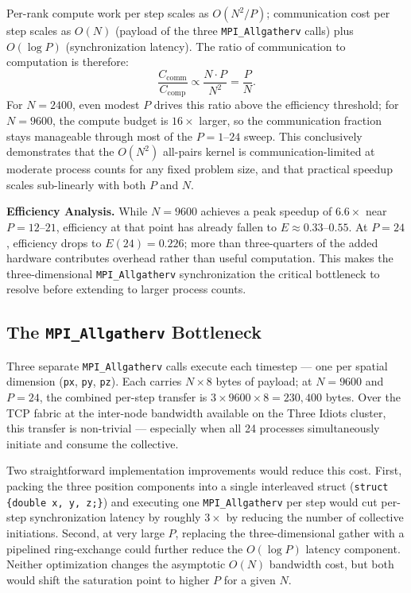 \documentclass[11pt]{article}
\begin{document}
Per-rank compute work per step scales as $O(N^2/P)$; communication cost per step scales as $O(N)$ (payload of the three \texttt{MPI\_Allgatherv} calls) plus $O(\log P)$ (synchronization latency). The ratio of communication to computation is therefore:
\begin{equation}
  \frac{C_\text{comm}}{C_\text{comp}} \propto \frac{N \cdot P}{N^2} = \frac{P}{N}.
\end{equation}
For $N = 2400$, even modest $P$ drives this ratio above the efficiency threshold; for $N = 9600$, the compute budget is $16\times$ larger, so the communication fraction stays manageable through most of the $P = 1$--$24$ sweep. This conclusively demonstrates that the $O(N^2)$ all-pairs kernel is communication-limited at moderate process counts for any fixed problem size, and that practical speedup scales sub-linearly with both $P$ and $N$.

\textbf{Efficiency Analysis.}  While $N = 9600$ achieves a peak speedup of $6.6\times$ near $P = 12$--$21$, efficiency at that point has already fallen to $E \approx 0.33$--$0.55$. At $P = 24$, efficiency drops to $E(24) = 0.226$; more than three-quarters of the added hardware contributes overhead rather than useful computation. This makes the three-dimensional \texttt{MPI\_Allgatherv} synchronization the critical bottleneck to resolve before extending to larger process counts.

\subsection{The \texttt{MPI\_Allgatherv} Bottleneck}

Three separate \texttt{MPI\_Allgatherv} calls execute each timestep — one per spatial dimension (\texttt{px}, \texttt{py}, \texttt{pz}). Each carries $N \times 8$ bytes of payload; at $N = 9600$ and $P = 24$, the combined per-step transfer is $3 \times 9600 \times 8 = 230{,}400$ bytes. Over the TCP fabric at the inter-node bandwidth available on the Three Idiots cluster, this transfer is non-trivial — especially when all 24 processes simultaneously initiate and consume the collective.

Two straightforward implementation improvements would reduce this cost. First, packing the three position components into a single interleaved struct (\texttt{struct \{double x, y, z;\}}) and executing one \texttt{MPI\_Allgatherv} per step would cut per-step synchronization latency by roughly $3\times$ by reducing the number of collective initiations. Second, at very large $P$, replacing the three-dimensional gather with a pipelined ring-exchange could further reduce the $O(\log P)$ latency component. Neither optimization changes the asymptotic $O(N)$ bandwidth cost, but both would shift the saturation point to higher $P$ for a given $N$.
\end{document}
